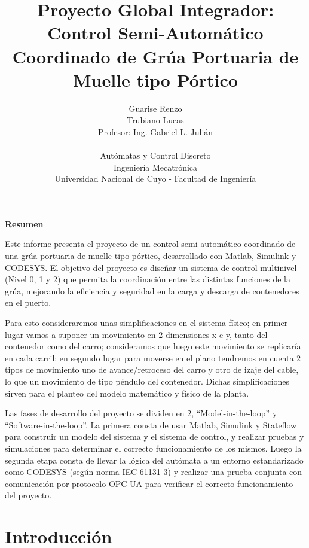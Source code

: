 \documentclass[11pt]{article}
\title{
	Proyecto Global Integrador:
	\\
	Control Semi-Automático Coordinado de Grúa Portuaria de Muelle tipo Pórtico
}
\author{
	Guarise Renzo
	\\
	Trubiano Lucas
	\\
	Profesor: Ing. Gabriel L. Julián
	\\
	\\
	Autómatas y Control Discreto
	\\
	Ingeniería Mecatrónica
	\\
	Universidad Nacional de Cuyo - Facultad de Ingeniería
}
\begin{document}
\maketitle

\begin{center} %
    {\Large \textbf{Resumen}}
\end{center}

Este informe presenta el proyecto de un control semi-automático coordinado de una grúa portuaria de muelle tipo pórtico, desarrollado con Matlab, Simulink y CODESYS. El objetivo del proyecto es diseñar un sistema de control multinivel (Nivel 0, 1 y 2) que permita la coordinación entre las distintas funciones de la grúa, mejorando la eficiencia y seguridad en la carga y descarga de contenedores en el puerto.
\par
Para esto consideraremos unas simplificaciones en el sistema físico; en primer lugar vamos a suponer un movimiento en 2 dimensiones x e y, tanto del contenedor como del carro; consideramos que luego este movimiento se replicaría en cada carril; en segundo lugar para moverse en el plano tendremos en cuenta 2 tipos de movimiento uno de avance/retroceso del carro y otro de izaje del cable, lo que un movimiento de tipo péndulo del contenedor. Dichas simplificaciones sirven para el planteo del modelo matemático y físico de la planta.
\par
Las fases de desarrollo del proyecto se dividen en 2, “Model-in-the-loop” y “Software-in-the-loop”. La primera consta de usar Matlab, Simulink y Stateflow para construir un modelo del sistema y el sistema de control, y realizar pruebas y simulaciones para determinar el correcto funcionamiento de los mismos. Luego la segunda etapa consta de llevar la lógica del autómata a un entorno estandarizado como CODESYS (según norma IEC 61131-3) y realizar una prueba conjunta con comunicación por protocolo OPC UA para verificar el correcto funcionamiento del proyecto.



\newpage
\section{Introducción}
\end{document}
